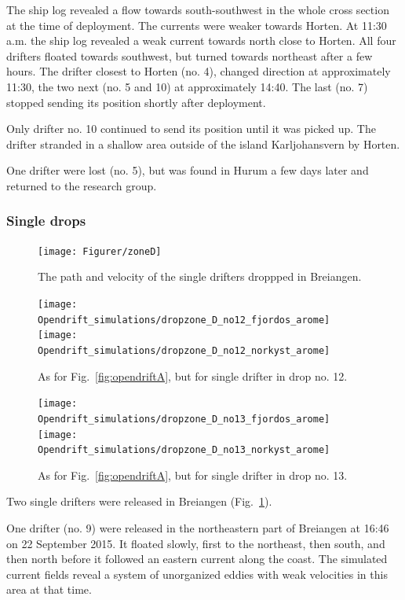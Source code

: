 \documentclass[12pt,a4paper,english]{article}
\begin{document}
The ship log revealed a flow towards south-southwest in the whole cross section at the time of deployment. The currents were weaker towards Horten. At 11:30 a.m. the ship log revealed a weak current towards north close to Horten. All four drifters floated towards southwest, but turned towards northeast after a few hours. The drifter closest to Horten (no. 4), changed direction at approximately 11:30, the two next (no. 5 and 10) at approximately 14:40. The last (no. 7) stopped sending its position shortly after deployment.

Only drifter no. 10 continued to send its position until it was picked up. The drifter stranded in a shallow area outside of the island Karljohansvern by Horten.

One drifter were lost (no. 5), but was found in Hurum a few days later and returned to the research group.

\subsubsection{Single drops}
%
\begin{figure}[ht]
\centerline{
\texttt{[image: Figurer/zoneD]}}
\caption{\small
The path and velocity of the single drifters droppped in Breiangen.}
\label{fig:ZoneD}
\end{figure}
%
\begin{figure}[ht]
\centerline{
\texttt{[image: Opendrift\_simulations/dropzone\_D\_no12\_fjordos\_arome]}
\texttt{[image: Opendrift\_simulations/dropzone\_D\_no12\_norkyst\_arome]}
}
\caption{\small
As for Fig.~\ref{fig:opendriftA}, but for single drifter in drop no. 12.
}
\label{fig:opendriftD1}
\end{figure}
%
\begin{figure}[ht]
\centerline{
\texttt{[image: Opendrift\_simulations/dropzone\_D\_no13\_fjordos\_arome]}
\texttt{[image: Opendrift\_simulations/dropzone\_D\_no13\_norkyst\_arome]}
}
\caption{\small
As for Fig.~\ref{fig:opendriftA}, but for single drifter in drop no. 13.
}
\label{fig:opendriftD2}
\end{figure}
%
Two single drifters were released in Breiangen (Fig.~\ref{fig:ZoneD}).

One drifter (no. 9) were released in the northeastern part of Breiangen at 16:46 on 22 September 2015. It floated slowly, first to the northeast, then south, and then north before it followed an eastern current along the coast. The simulated current fields reveal a system of unorganized eddies with weak velocities in this area at that time.
\end{document}

